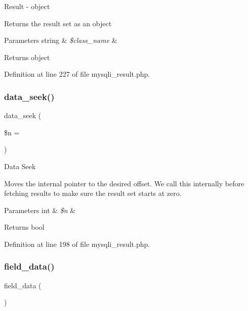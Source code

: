 Result -\/ object

Returns the result set as an object


\begin{DoxyParams}[1]{Parameters}
string & {\em \$class\+\_\+name} & \\
\hline
\end{DoxyParams}
\begin{DoxyReturn}{Returns}
object 
\end{DoxyReturn}


Definition at line 227 of file mysqli\+\_\+result.\+php.

\mbox{\label{class_c_i___d_b__mysqli__result_a8255ae91816e4206e29eb7581c5af0f1}} 
\subsubsection{\texorpdfstring{data\_seek()}{data\_seek()}}
{\footnotesize\ttfamily data\+\_\+seek (\begin{DoxyParamCaption}\item[{}]{\$n = {} }\end{DoxyParamCaption})}

Data Seek

Moves the internal pointer to the desired offset. We call this internally before fetching results to make sure the result set starts at zero.


\begin{DoxyParams}[1]{Parameters}
int & {\em \$n} & \\
\hline
\end{DoxyParams}
\begin{DoxyReturn}{Returns}
bool 
\end{DoxyReturn}


Definition at line 198 of file mysqli\+\_\+result.\+php.

\mbox{\label{class_c_i___d_b__mysqli__result_a84bffd65e53902ade1591716749a33e3}} 
\subsubsection{\texorpdfstring{field\_data()}{field\_data()}}
{\footnotesize\ttfamily field\+\_\+data (\begin{DoxyParamCaption}{ }\end{DoxyParamCaption})}

